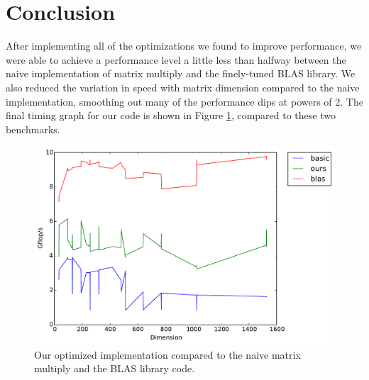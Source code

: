\documentclass[letterpaper]{article}	 %
\begin{document}
\section{Conclusion}

After implementing all of the optimizations we found to improve performance, we were able to achieve a performance level a little less than halfway between the naive implementation of matrix multiply and the finely-tuned BLAS library. We also reduced the variation in speed with matrix dimension compared to the naive implementation, smoothing out many of the performance dips at powers of 2. 
The final timing graph for our code is shown in Figure \ref{fig:final}, compared to these two benchmarks.

\begin{figure}[H]
  \centering
  \includegraphics[width=.6\linewidth]{timing-final-comparison.pdf}
  \caption{Our optimized implementation compared to the naive matrix multiply and the BLAS library code.}
  \label{fig:final}
\end{figure}
\end{document}
